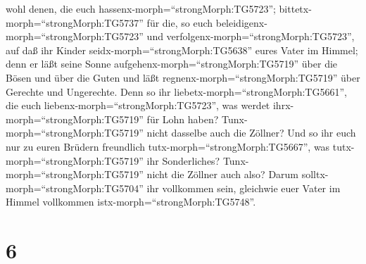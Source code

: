 wohl denen, die euch hassenx-morph=``strongMorph:TG5723'';
bittetx-morph=``strongMorph:TG5737'' für die, so euch
beleidigenx-morph=``strongMorph:TG5723'' und
verfolgenx-morph=``strongMorph:TG5723'',  auf daß ihr
Kinder seidx-morph=``strongMorph:TG5638'' eures Vater im Himmel; denn er
läßt seine Sonne aufgehenx-morph=``strongMorph:TG5719'' über die Bösen
und über die Guten und läßt regnenx-morph=``strongMorph:TG5719'' über
Gerechte und Ungerechte.  Denn so ihr
liebetx-morph=``strongMorph:TG5661'', die euch
liebenx-morph=``strongMorph:TG5723'', was werdet
ihrx-morph=``strongMorph:TG5719'' für Lohn haben?
Tunx-morph=``strongMorph:TG5719'' nicht dasselbe auch die Zöllner?
 Und so ihr euch nur zu euren Brüdern freundlich
tutx-morph=``strongMorph:TG5667'', was tutx-morph=``strongMorph:TG5719''
ihr Sonderliches? Tunx-morph=``strongMorph:TG5719'' nicht die Zöllner
auch also?  Darum solltx-morph=``strongMorph:TG5704'' ihr
vollkommen sein, gleichwie euer Vater im Himmel vollkommen
istx-morph=``strongMorph:TG5748''.

\hypertarget{section-5}{%
\section{6}\label{section-5}}

